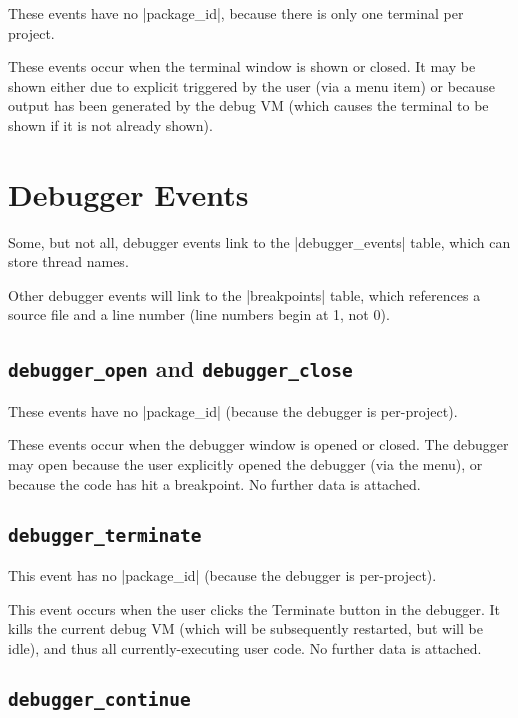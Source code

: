 \documentclass{book}
\begin{document}
These events have no |package_id|, because there is only one terminal
per project.

These events occur when the terminal window is shown or closed.  It
may be shown either due to explicit triggered by the user (via a menu
item) or because output has been generated by the debug VM (which
causes the terminal to be shown if it is not already shown).

\section{Debugger Events}

Some, but not all, debugger events link to the |debugger_events|
table, which can store thread names.


Other debugger events will link to the |breakpoints| table, which references a
source file and a line number (line numbers begin at 1, not 0).


\subsection{\lstinline|debugger_open| and \lstinline|debugger_close|}

These events have no |package_id| (because the debugger is per-project).

These events occur when the debugger window is opened or closed.  The debugger
may open because the user explicitly opened the debugger (via the menu), or
because the code has hit a breakpoint.  No further data is attached.

\subsection{\lstinline|debugger_terminate|}

This event has no |package_id| (because the debugger is per-project).

This event occurs when the user clicks the Terminate button in the debugger.
It kills the current debug VM (which will be subsequently restarted, but will
be idle), and thus all currently-executing user code.  No
further data is attached.

\subsection{\lstinline|debugger_continue|}
\end{document}
